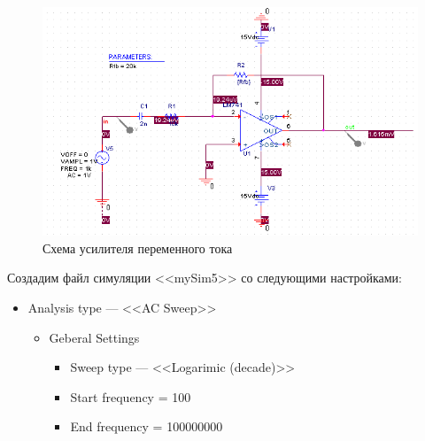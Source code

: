 \documentclass[utf8x, 12pt]{G7-32}
\begin{document}
\begin{figure}[h]
	\begin{center}
		\includegraphics[width=12cm]{img/shema_4}
	\end{center}
	\vspace{-5mm}\caption{Схема усилителя переменного тока}
\end{figure}	


Создадим файл симуляции <<mySim5>> со следующими настройками:

	\begin{itemize}	
		\item Analysis type --- <<AC Sweep>>
		\begin{itemize}	
			\item Geberal Settings
			\begin{itemize}	
				\item Sweep type --- <<Logarimic (decade)>>
				\item Start frequency = 100
				\item End frequency = 100000000
				
			\end{itemize}
		\end{itemize}
	\end{itemize}
\end{document}
